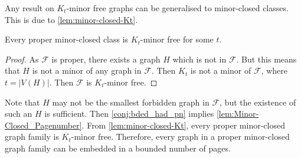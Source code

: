 Any result on $K_t$-minor free graphs can be generalised to minor-closed classes. This is due to \cref{lem:minor-closed-Kt}. 

\begin{lemma}\label{lem:minor-closed-Kt}
    Every proper minor-closed class is $K_t$-minor free for some $t$. 
\end{lemma}
\begin{proof}
    As $\mathcal{F}$ is proper, there exists a graph $H$ which is not in $\mathcal{F}$. But this means that $H$ is not a minor of any graph in $\mathcal{F}$. Then $K_t$ is not a minor of $\mathcal{F}$, where $t = |V(H)|$. Then $\mathcal{F}$ is $K_t$-minor free. 
\end{proof}
Note that $H$ may not be the smallest forbidden graph in $\mathcal{F}$, but the existence of such an $H$ is sufficient. 
Then \cref{conj:bded_had_pn} implies \cref{lem:Minor-Closed_Pagenumber}. From \cref{lem:minor-closed-Kt}, every proper minor-closed graph family is $K_t$-minor free. Therefore, every graph in a proper minor-closed graph family can be embedded in a bounded number of pages.
